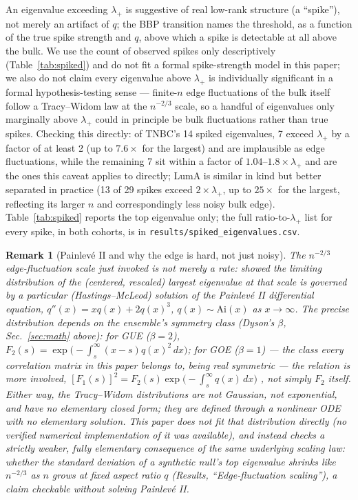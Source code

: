 \documentclass[11pt]{article}
\newtheorem{remark}{Remark}
\begin{document}
An eigenvalue exceeding $\lambda_+$ is suggestive of real low-rank
structure (a ``spike''), not merely an artifact of $q$; the BBP
transition \citep{baik2005} names the threshold, as a function of the
true spike strength and $q$, above which a spike is detectable at all
above the bulk. We use the count of observed spikes only descriptively
(Table~\ref{tab:spiked}) and do not fit a formal spike-strength model
in this paper; we also do not claim every eigenvalue above $\lambda_+$
is individually significant in a formal hypothesis-testing sense ---
finite-$n$ edge fluctuations of the bulk itself follow a Tracy--Widom
law \citep{tracywidom1994} at the $n^{-2/3}$ scale, so a handful of eigenvalues only marginally
above $\lambda_+$ could in principle be bulk fluctuations rather than
true spikes. Checking this directly: of TNBC's 14 spiked eigenvalues,
7 exceed $\lambda_+$ by a factor of at least 2 (up to $7.6\times$ for
the largest) and are implausible as edge fluctuations, while the
remaining 7 sit within a factor of $1.04$--$1.8\times\lambda_+$ and are
the ones this caveat applies to directly; LumA is similar in kind but
better separated in practice (13 of 29 spikes exceed $2\times\lambda_+$,
up to $25\times$ for the largest, reflecting its larger $n$ and
correspondingly less noisy bulk edge). Table~\ref{tab:spiked} reports
the top eigenvalue only; the full ratio-to-$\lambda_+$ list for every
spike, in both cohorts, is in \texttt{results/spiked\_eigenvalues.csv}.

\begin{remark}[Painlev\'e II and why the edge is hard, not just noisy]
The $n^{-2/3}$ edge-fluctuation scale just invoked is not merely a rate:
\citet{tracywidom1994} showed the limiting distribution of the
(centered, rescaled) largest eigenvalue at that scale is governed by a
particular (Hastings--McLeod) solution of the Painlev\'e II
differential equation, $q''(x)=xq(x)+2q(x)^3$, $q(x)\sim\mathrm{Ai}(x)$
as $x\to\infty$. The precise distribution depends on the ensemble's
symmetry class (Dyson's $\beta$, Sec.~\ref{sec:math} above): for GUE
($\beta=2$), $F_2(s)=\exp\!\big(-\int_s^\infty (x-s)q(x)^2\,dx\big)$;
for GOE ($\beta=1$) --- the class every correlation matrix in this
paper belongs to, being real symmetric --- the relation is more
involved, $[F_1(s)]^2=F_2(s)\exp\!\big(-\int_s^\infty q(x)\,dx\big)$
\citep{tracywidom1996}, not simply $F_2$ itself. Either way, the
Tracy--Widom distributions are not Gaussian, not exponential, and have
no elementary closed form; they are defined \emph{through} a nonlinear
ODE with no elementary solution. This paper does not fit that
distribution directly (no verified numerical implementation of it was
available), and instead checks a strictly weaker, fully elementary
consequence of the same underlying scaling law: whether the standard
deviation of a synthetic null's top eigenvalue shrinks like $n^{-2/3}$
as $n$ grows at fixed aspect ratio $q$ (Results, ``Edge-fluctuation
scaling''), a claim checkable without solving
Painlev\'e II.
\end{remark}
\end{document}
